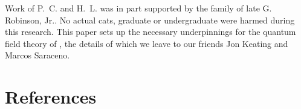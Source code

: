 \documentclass[12pt]{iopart}
\begin{document}
\ack
Work of P.~C. and H.~L. was in part supported by the family of late G. Robinson,
Jr..
No actual cats, graduate or undergraduate %
were harmed during this research. This paper sets up the necessary
underpinnings for the quantum field theory of \catlatt, the details of
which we leave to our %
friends Jon Keating and Marcos Saraceno.



%

    \ifsubmission
\section*{References}

    \else
\printbibliography[
heading=bibintoc,
title={References}
				  ] %
    \fi


    \ifboyscout
%
%

    \clearpage
    
    
    \fi %
\end{document}
